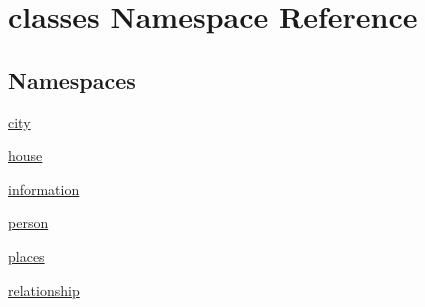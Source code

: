 \hypertarget{namespaceclasses}{}\section{classes Namespace Reference}
\label{namespaceclasses}
\subsection*{Namespaces}
\begin{DoxyCompactItemize}
\item 
 \hyperlink{namespaceclasses_1_1city}{city}
\item 
 \hyperlink{namespaceclasses_1_1house}{house}
\item 
 \hyperlink{namespaceclasses_1_1information}{information}
\item 
 \hyperlink{namespaceclasses_1_1person}{person}
\item 
 \hyperlink{namespaceclasses_1_1places}{places}
\item 
 \hyperlink{namespaceclasses_1_1relationship}{relationship}
\end{DoxyCompactItemize}
